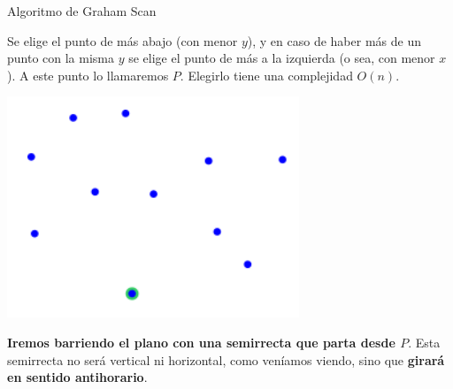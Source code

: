 \documentclass[compress]{beamer}
\newcommand{\bigpause}{\bigskip \pause}
\begin{document}
\begin{frame}{Algoritmo de Graham Scan}

Se elige el punto de m\'as abajo (con menor $y$), y en caso de haber m\'as de un punto con la misma $y$ se elige el punto de m\'as a la izquierda (o sea, con menor $x$). A este punto lo llamaremos $P$. Elegirlo tiene una complejidad $O(n)$.

\bigskip

\begin{center}
\includegraphics[scale=0.5]{images/convex_hull1.png}
\end{center}

\end{frame}

\begin{frame}
\textbf{Iremos barriendo el plano con una semirrecta que parta desde $P$}. Esta semirrecta no ser\'a vertical ni horizontal, como ven\'iamos viendo, sino que \textbf{girar\'a en sentido antihorario}.

\bigpause
{}
\end{frame}
\end{document}
